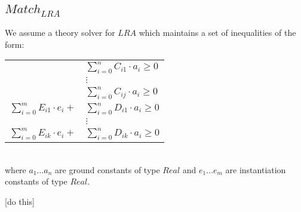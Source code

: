 \documentclass{llncs}
\begin{document}
\begin{comment}

We claim that the relevant subset of substitutions $E$-matching produces can be thought of as a special case of $Match_{EUF}$.
That is, $Match_{EUF}$ is equivalent to $E$-matching if we restrict ourselves to
[do this]
\end{comment}

\subsection{$Match_{LRA}$}

We assume a theory solver for $LRA$ which maintains a set of inequalities of the form:

\begin{tabular}{rl}
 & $\displaystyle\sum\limits_{i=0}^n C_{i1} \cdot a_i \geq 0$ \\
 & $\vdots$ \\
 & $\displaystyle\sum\limits_{i=0}^n C_{ij} \cdot a_i \geq 0$ \\
 $\displaystyle\sum\limits_{i=0}^m E_{i1} \cdot e_i +$ & $\displaystyle\sum\limits_{i=0}^n D_{i1} \cdot a_i \geq 0$ \\
 & $\vdots$ \\
 $\displaystyle\sum\limits_{i=0}^m E_{ik} \cdot e_i +$ & $\displaystyle\sum\limits_{i=0}^n D_{ik} \cdot a_i \geq 0$ \\
 \end{tabular} \\

where $a_1 \ldots a_n$ are ground constants of type $Real$ and $e_1 \ldots e_m$ are instantiation constants of type $Real$.

[do this]
\end{document}
